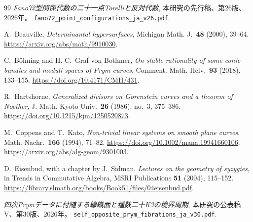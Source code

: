 \clearpage
\begingroup\small
\begin{thebibliography}{99}
\setlength{\itemsep}{2pt}
\setlength{\parskip}{0pt}
\emph{Fano72型関係代数の二十一点Torelliと反対代数}, 本研究の先行稿、第26版、2026年。
\nolinkurl{fano72_point_configurations_ja_v26.pdf}.

A.~Beauville, \emph{Determinantal hypersurfaces}, Michigan Math. J.\ \textbf{48} (2000), 39--64.
\url{https://arxiv.org/abs/math/9910030}.

C.~B\"ohning and H.-C.~Graf von Bothmer,
\emph{On stable rationality of some conic bundles and moduli spaces of Prym curves},
Comment. Math. Helv.\ \textbf{93} (2018), 133--155.
\url{https://doi.org/10.4171/CMH/431}.

R.~Hartshorne, \emph{Generalized divisors on Gorenstein curves and a theorem of Noether},
J. Math. Kyoto Univ.\ \textbf{26} (1986), no.~3, 375--386.
\url{https://doi.org/10.1215/kjm/1250520873}.

M.~Coppens and T.~Kato, \emph{Non-trivial linear systems on smooth plane curves},
Math. Nachr.\ \textbf{166} (1994), 71--82.
\url{https://doi.org/10.1002/mana.19941660106}.
\url{https://arxiv.org/abs/alg-geom/9301003}.

D.~Eisenbud, with a chapter by J.~Sidman,
\emph{Lectures on the geometry of syzygies},
in Trends in Commutative Algebra, MSRI Publications \textbf{51} (2004), 115--152.
\url{https://library.slmath.org/books/Book51/files/04eisenbud.pdf}.

\emph{四次Prymデータに付随する線織面と種数二十K3の境界周期}, 本研究の公表稿V、第30版、2026年。
\nolinkurl{self_opposite_prym_fibrations_ja_v30.pdf}.
\end{thebibliography}
\endgroup

